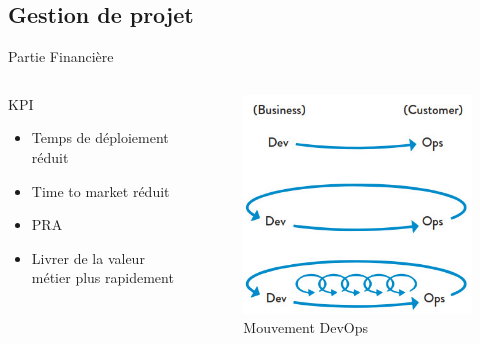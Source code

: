 \subsection{Gestion de projet}
\begin{frame}{Partie Financière}
	\begin{columns}[onlytextwidth]
		\begin{block}{KPI}
			\begin{itemize}
				\item Temps de déploiement réduit
				\item Time to market réduit
				\item PRA
				\item Livrer de la valeur métier plus rapidement
			\end{itemize}
		\end{block}
		\pause
		\begin{figure}
			\includegraphics[width=0.9\linewidth]{img/devops-objective.jpg}
			\caption{Mouvement DevOps}
			\label{fig:devops}
		\end{figure}
	\end{columns}
\end{frame}


